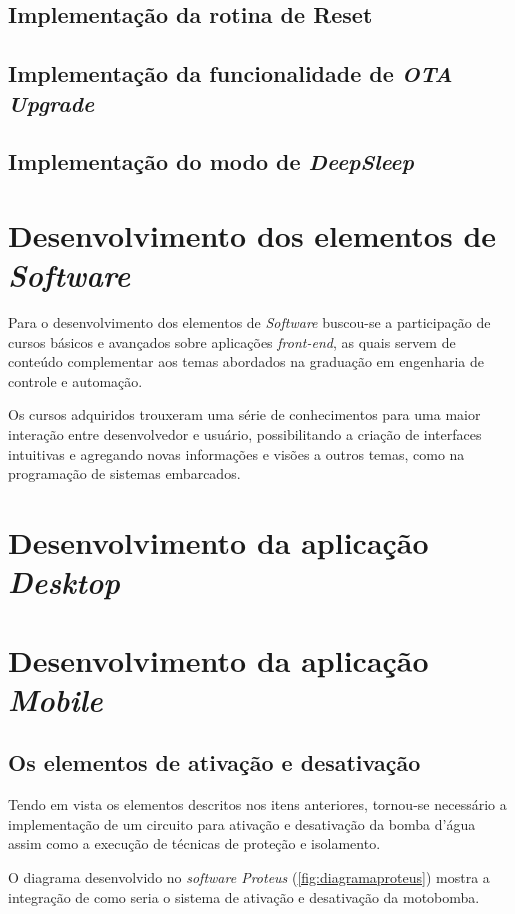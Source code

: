 \subsection{Implementação da rotina de Reset}
\subsection{Implementação da funcionalidade de \textit{OTA Upgrade}}
\subsection{Implementação do modo de \textit{DeepSleep}}


\section{Desenvolvimento dos elementos de \textit{Software}}


Para o desenvolvimento dos elementos de \textit{Software} buscou-se a participação de cursos básicos e avançados sobre aplicações \textit{front-end}, as quais servem de conteúdo complementar aos temas abordados na graduação em engenharia de controle e automação.

Os cursos adquiridos trouxeram uma série de conhecimentos para uma maior interação entre desenvolvedor e usuário, possibilitando a criação de interfaces intuitivas e agregando novas informações e visões a outros temas, como na programação de sistemas embarcados.

\section{Desenvolvimento da aplicação \textit{Desktop}}
\section{Desenvolvimento da aplicação \textit{Mobile}}



\subsection{Os elementos de ativação e desativação}

Tendo em vista os elementos descritos nos itens anteriores, tornou-se necessário a implementação de um circuito para ativação e desativação da bomba d'água assim como a execução de técnicas de proteção e isolamento.

O diagrama desenvolvido no \textit{software Proteus} (\autoref{fig:diagramaproteus}) mostra a integração de como seria o sistema de ativação e desativação da motobomba.

